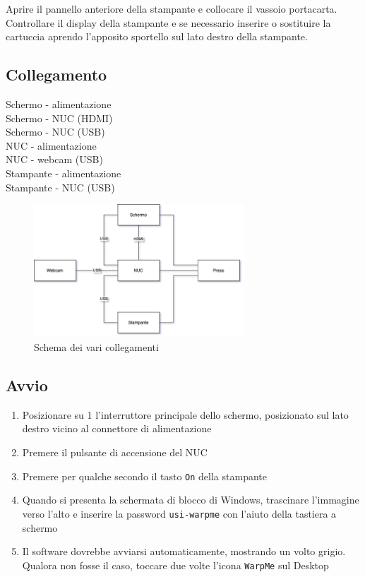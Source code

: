 \documentclass[12pt]{article}
\begin{document}
		Aprire il pannello anteriore della stampante e collocare il vassoio portacarta. Controllare il display della stampante e se necessario inserire o sostituire la cartuccia aprendo l'apposito sportello sul lato destro della stampante.
		
		
	\subsection{Collegamento}
	
		Schermo - alimentazione\\
		Schermo - NUC (HDMI)\\
		Schermo - NUC (USB)\\
		
		NUC - alimentazione\\
		NUC - webcam (USB)\\
		
		Stampante - alimentazione\\
		Stampante - NUC (USB)\\
	
		\begin{figure}[H]
                \centering
                \includegraphics[width=0.7\textwidth]{img/cables_it.png}
                \caption{Schema dei vari collegamenti}
                \label{cables}
        \end{figure}
		
		
	\subsection{Avvio}
	
	\begin{enumerate}		
		\item Posizionare su 1 l'interruttore principale dello schermo, posizionato sul lato destro vicino al connettore di alimentazione
		\item Premere il pulsante di accensione del NUC
		\item Premere per qualche secondo il tasto \texttt{On} della stampante
		\item Quando si presenta la schermata di blocco di Windows, trascinare l'immagine verso l'alto e inserire la password \texttt{usi-warpme} con l'aiuto della tastiera a schermo
		\item Il software dovrebbe avviarsi automaticamente, mostrando un volto grigio. Qualora non fosse il caso, toccare due volte l'icona \texttt{WarpMe} sul Desktop
	\end{enumerate}	
		
\end{document}

